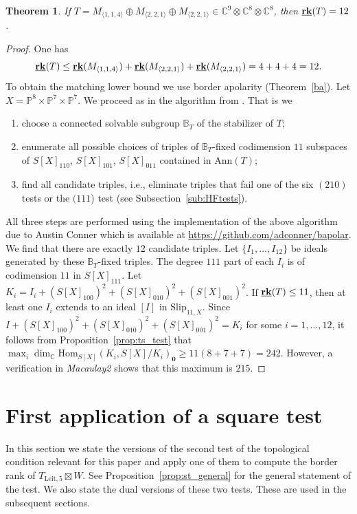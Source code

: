 \documentclass[12pt]{amsart}
\newtheorem{theorem}{Theorem}[section]
\theoremstyle{definition}
\theoremstyle{remark}
\theoremstyle{definition}
\newcommand{\brk}{{\underline{{\bf rk}}}}
\newcommand{\Hom}{\mathrm{Hom}}
\newcommand{\Slip}[2]{\mathrm{Slip}_{#1,#2}}
\newcommand{\CC}{\mathbb{C}}
\newcommand{\PP}{\mathbb{P}}
\newcommand{\Ann}{\mathrm{Ann}}
\begin{document}
\begin{theorem}\label{thm:Scho}
    If $T=M_{\langle 1, 1, 4\rangle} \oplus M_{\langle 2,2,1\rangle} \oplus M_{\langle 2,2,1\rangle}  \in \CC^{9}\otimes \CC^{8}\otimes \CC^{8}$, then $\brk(T) =12$.
\end{theorem}
\begin{proof}
One has
\[
\brk(T) \le \brk(M_{\langle 1, 1, 4\rangle})+ \brk(M_{\langle 2,2,1\rangle}) + \brk( M_{\langle 2,2,1\rangle})  = 4 + 4 + 4 = 12.
\]
To obtain the matching lower bound we use border apolarity (Theorem~\ref{ba}). Let $X=\PP^8\times \PP^7\times \PP^7$. We proceed as in the algorithm from \cite[Section~3]{chl19}. That is we
\begin{enumerate}
    \item choose a connected solvable subgroup $\mathbb{B}_T$ of the stabilizer of $T$;
    \item enumerate all possible choices of triples of $\mathbb{B}_T$-fixed codimension $11$ subspaces of $S[X]_{110}$, $S[X]_{101}$, $S[X]_{011}$ contained in $\Ann(T)$;
    \item find all candidate triples, i.e.,  eliminate triples that fail one of the six $(210)$ tests or the $(111$) test (see Subsection~\ref{sub:HFtests}).
\end{enumerate}
All three steps are performed using the implementation of the above algorithm due to Austin Conner which is available at \url{https://github.com/adconner/bapolar}.
We find that there are exactly $12$ candidate triples. Let $\{I_1,\ldots, I_{12}\}$ be ideals generated by these $\mathbb{B}_T$-fixed triples. The degree $111$ part of each $I_i$ is of codimension $11$ in $S[X]_{111}$. Let $K_i = I_i + (S[X]_{100})^2 + (S[X]_{010})^2 + (S[X]_{001})^2$. 
If $\brk(T) \le 11$, then at least one $I_i$ extends to an ideal $[I]$ in $\Slip{11}{X}$. Since $I+(S[X]_{100})^2 + (S[X]_{010})^2 + (S[X]_{001})^2 = K_i$ for some $i=1,\ldots, 12$, it follows from Proposition~\ref{prop:ts_test} that $\max_i \dim_\CC \Hom_{S[X]}(K_i, S[X]/K_i)_\mathbf{0} \ge 11(8+7+7) = 242$. However, a verification in \textit{Macaulay2} \cite{M2} shows that this maximum is $215$.
 \end{proof}



\section{First application of a square test}

In this section we state the versions of the second test of the topological condition relevant for this paper and apply one of them to compute the border rank of $T_{\mathrm{Leit},{5}}\boxtimes W$. See Proposition~\ref{prop:st_general} for the general statement of the test.
We also state the dual versions of these two tests. These are used in the subsequent sections.
\end{document}
